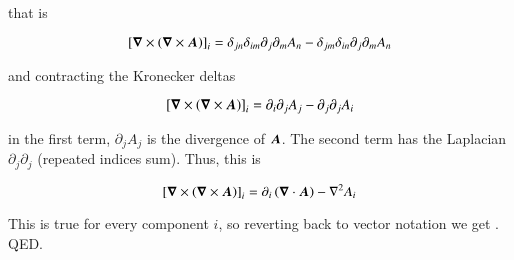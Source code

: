 \noindent that is 

\begin{equation}
\left[{\boldsymbol{\nabla}}\times{\left({\boldsymbol{\nabla}}\times{{\boldsymbol{A}}}\right)}\right]_i=\delta_{jn}\delta_{im}\partial_j \partial_m A_n-\delta_{jm}\delta_{in}\partial_j \partial_m A_n
\end{equation}

\noindent and contracting the Kronecker deltas 

\begin{equation}
\left[{\boldsymbol{\nabla}}\times{\left({\boldsymbol{\nabla}}\times{{\boldsymbol{A}}}\right)}\right]_i=\partial_i\partial_j  A_j-\partial_j \partial_j A_i
\end{equation}

\noindent in the first term, $\partial_j  A_j$ is the divergence of ${\boldsymbol{A}}$. The second term has the Laplacian $\partial_j \partial_j$ (repeated indices sum). Thus, this is 

\begin{equation}
\left[{\boldsymbol{\nabla}}\times{\left({\boldsymbol{\nabla}}\times{{\boldsymbol{A}}}\right)}\right]_i=\partial_i\left({\boldsymbol{\nabla}}\cdot{{\boldsymbol{A}}}\right) -\nabla^2 A_i
\end{equation}

\noindent This is true for every component $i$, so reverting back to
vector notation we get . QED.
